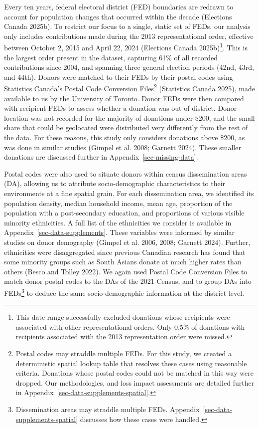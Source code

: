 \documentclass[
  letterpaper,
  DIV=11,
  numbers=noendperiod]{scrartcl}
\begin{document}
Every ten years, federal electoral district (FED) boundaries are redrawn
to account for population changes that occurred within the decade
(Elections Canada 2025b). To restrict our focus to a single, static set
of FEDs, our analysis only includes contributions made during the 2013
representational order, effective between October 2, 2015 and April 22,
2024 (Elections Canada 2025b)\footnote{This date range successfully
  excluded donations whose recipients were associated with other
  representational orders. Only 0.5\% of donations with recipients
  associated with the 2013 representation order were missed.}. This is
the largest order present in the dataset, capturing 61\% of all recorded
contributions since 2004, and spanning three general election periods
(42nd, 43rd, and 44th). Donors were matched to their FEDs by their
postal codes using Statistics Canada's Postal Code Conversion
Files\footnote{Postal codes may straddle multiple FEDs. For this study,
  we created a deterministic spatial lookup table that resolves these
  cases using reasonable criteria. Donations whose postal codes could
  not be matched in this way were dropped. Our methodologies, and loss
  impact assessments are detailed further in
  Appendix~\ref{sec-data-supplements-spatial}.} (Statistics Canada
2025), made available to us by the University of Toronto. Donor FEDs
were then compared with recipient FEDs to assess whether a donation was
out-of-district. Donor location was not recorded for the majority of
donations under \$200, and the small share that could be geolocated were
distributed very differently from the rest of the data. For these
reasons, this study only considers donations above \$200, as was done in
similar studies (Gimpel et al. 2008; Garnett 2024). These smaller
donations are discussed further in Appendix~\ref{sec-missing-data}.

Postal codes were also used to situate donors within census
dissemination areas (DA), allowing us to attribute socio-demographic
characteristics to their environments at a fine spatial grain. For each
dissemination area, we identified its population density, median
household income, mean age, proportion of the population with a
post-secondary education, and proportions of various visible minority
ethnicities. A full list of the ethnicities we consider is available in
Appendix~\ref{sec-data-supplements}. These variables were informed by
similar studies on donor demography (Gimpel et al. 2006, 2008; Garnett
2024). Further, ethnicities were disaggregated since previous Canadian
research has found that some minority groups such as South Asians donate
at much higher rates than others (Besco and Tolley 2022). We again used
Postal Code Conversion Files to match donor postal codes to the DAs of
the 2021 Census, and to group DAs into FEDs\footnote{Dissemination areas
  may straddle multiple FEDs.
  Appendix~\ref{sec-data-supplements-spatial} discusses how these cases
  were handled.} to deduce the same socio-demographic information at the
district level.
\end{document}
